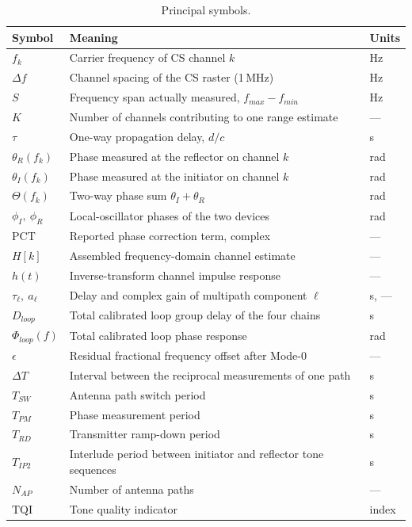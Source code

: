 \documentclass[11pt,a4paper]{article}
\newcommand{\PCT}{\mathrm{PCT}}
\newcommand{\TQI}{\mathrm{TQI}}
\newcommand{\Tsw}{T_{SW}}
\newcommand{\Tpm}{T_{PM}}
\newcommand{\Trd}{T_{RD}}
\newcommand{\Tipp}{T_{IP2}}
\newcommand{\Nap}{N_{AP}}
\begin{document}
\begin{table}[h]
\caption{Principal symbols.}
\label{tab:symbols}
\centering\small
\begin{tabular}{@{}L{28mm}L{78mm}L{22mm}@{}}
\toprule
Symbol & Meaning & Units \\
\midrule
$f_k$ & Carrier frequency of CS channel $k$ & Hz \\
$\Delta f$ & Channel spacing of the CS raster (1\,MHz) & Hz \\
$S$ & Frequency span actually measured, $f_{max}-f_{min}$ & Hz \\
$K$ & Number of channels contributing to one range estimate & --- \\
$\tau$ & One-way propagation delay, $d/c$ & s \\
$\theta_R(f_k)$ & Phase measured at the reflector on channel $k$ & rad \\
$\theta_I(f_k)$ & Phase measured at the initiator on channel $k$ & rad \\
$\Theta(f_k)$ & Two-way phase sum $\theta_I+\theta_R$ & rad \\
$\phi_I,\ \phi_R$ & Local-oscillator phases of the two devices & rad \\
$\PCT$ & Reported phase correction term, complex & --- \\
$H[k]$ & Assembled frequency-domain channel estimate & --- \\
$h(t)$ & Inverse-transform channel impulse response & --- \\
$\tau_\ell,\ a_\ell$ & Delay and complex gain of multipath component $\ell$ & s, --- \\
$D_{loop}$ & Total calibrated loop group delay of the four chains & s \\
$\Phi_{loop}(f)$ & Total calibrated loop phase response & rad \\
$\epsilon$ & Residual fractional frequency offset after Mode-0 & --- \\
$\Delta T$ & Interval between the reciprocal measurements of one path & s \\
$\Tsw$ & Antenna path switch period & s \\
$\Tpm$ & Phase measurement period & s \\
$\Trd$ & Transmitter ramp-down period & s \\
$\Tipp$ & Interlude period between initiator and reflector tone sequences & s \\
$\Nap$ & Number of antenna paths & --- \\
$\TQI$ & Tone quality indicator & index \\
\bottomrule
\end{tabular}
\end{table}
\end{document}
